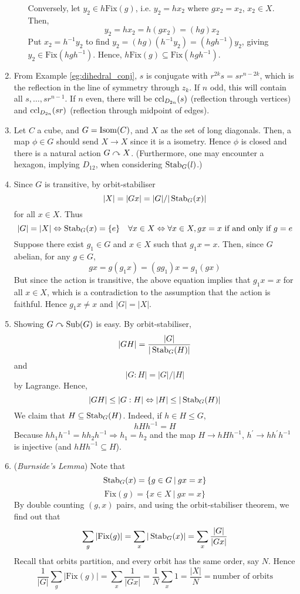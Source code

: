 \documentclass[10pt, a4paper, twoside]{report}
\begin{document}
\begin{enumerate}[{1.}]
\begin{enumerate}[{(a)}]
        Conversely, let \(y_2\in h\text{Fix}(g)\), i.e. \(y_2=hx_2\) where \(gx_2=x_2\), \(x_2\in X\). Then, 
        \[y_2=hx_2=h(gx_2)=(hg)x_2\]
        Put \(x_2=h^{-1}y_2\) to find \(y_2=(hg)(h^{-1}y_2)=(hgh^{-1})y_2\), giving \(y_2\in\text{Fix}(hgh^{-1})\). Hence, \(h\text{Fix}(g)\subseteq\text{Fix}(hgh^{-1})\).
    \end{enumerate}
    \item From Example \ref{eg:dihedral_conj}, \(s\) is conjugate with \(r^{2k}s=sr^{n-2k}\), which is the reflection in the line of symmetry through \(z_k\). If \(n\) odd, this will contain all \(s,\ldots,sr^{n-1}\). If \(n\) even, there will be \(\operatorname{ccl}_{D_{2n}}(s)\) (reflection through vertices) and \(\operatorname{ccl}_{D_{2n}}(sr)\) (reflection through midpoint of edges).
    \item Let \(C\) a cube, and \(G=\operatorname{Isom}(C)\), and \(X\) as the set of long diagonals. Then, a map \(\phi\in G\) should send \(X\to X\) since it is a isometry. Hence \(\phi\) is closed and there is a natural action \(G\curvearrowright X\). (Furthermore, one may encounter a hexagon, implying \(D_{12}\), when considering \(\operatorname{Stab}_G(l)\).)
    \item Since \(G\) is transitive, by orbit-stabiliser
    \[|X|=|Gx|=|G|/|\operatorname{Stab}_G(x)|\]
    for all \(x\in X\). Thus 
    \[|G|=|X|\Leftrightarrow\operatorname{Stab}_G(x)=\{e\}\quad\forall x\in X\Leftrightarrow\forall x\in X,gx=x\text{  if and only if  }g=e\]
    Suppose there exist \(g_1\in G\) and \(x\in X\) such that \(g_1x=x\). Then, since \(G\) abelian, for any \(g\in G\),
    \[gx=g(g_1x)=(gg_1)x=g_1(gx)\]
    But since the action is transitive, the above equation implies that \(g_1x=x\) for all \(x\in X\), which is a contradiction to the assumption that the action is faithful.
    Hence \(g_1x\neq x\) and \(|G|=|X|\).
    \item Showing \(G\curvearrowright\text{Sub}(G)\) is easy. By orbit-stabiliser,
    \[|GH|=\frac{|G|}{|\operatorname{Stab}_G(H)|}\]
    and 
    \[|G:H|=|G|/|H|\]
    by Lagrange. Hence, 
    \[|GH|\leq|G:H|\Leftrightarrow |H|\leq|\operatorname{Stab}_G(H)|\]
    We claim that \(H\subseteq\operatorname{Stab}_G(H)\). Indeed, if \(h\in H\leq G\),
    \[hHh^{-1}=H\]
    Because \(hh_1h^{-1}=hh_2h^{-1}\Rightarrow h_1=h_2\) and the map \(H\to hHh^{-1}\), \(h^\prime\to hh^\prime h^{-1}\) is injective (and \(hHh^{-1}\subseteq H\)).
    \item (\emph{Burnside's Lemma}) Note that 
    \[\operatorname{Stab}_G(x)=\{g\in G\:|\:gx=x\}\]
    \[\text{Fix}(g)=\{x\in X\:|\:gx=x\}\]
    By double counting \((g,x)\) pairs, and using the orbit-stabiliser theorem, we find out that 
    \[\sum_g|\text{Fix}(g)|=\sum_x|\operatorname{Stab}_G(x)|=\sum_x\frac{|G|}{|Gx|}\]
    Recall that orbits partition, and every orbit has the same order, say \(N\). Hence 
    \[\frac 1{|G|}\sum_g|\text{Fix}(g)|=\sum_x\frac{1}{|Gx|}=\frac 1N\sum_x 1=\frac{|X|}{N}=\text{number of orbits}\]


\end{enumerate}
\end{document}
